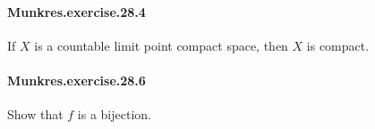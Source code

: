 \documentclass{article}
\begin{document}

\paragraph{Munkres.exercise.28.4} If $X$ is a countable limit point compact space, then $X$ is compact.

\paragraph{Munkres.exercise.28.6} Show that $f$ is a bijection.

\end{document}

